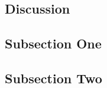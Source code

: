 \documentclass[twoside]{article}
\begin{document}
\begin{multicols}{2}

\section{Discussion}

\subsection{Subsection One}



\subsection{Subsection Two}










\end{multicols}
\end{document}
